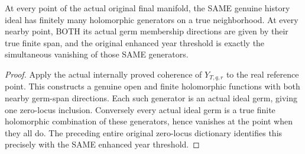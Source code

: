 \begin{theorem}
\label{hir:original-global-companion-history-year-local-generators}
\leanok
{}
At every point of the actual original final manifold, the SAME genuine history
ideal has finitely many holomorphic generators on a true neighborhood. At
every nearby point, BOTH its actual germ membership directions are given by
their true finite span, and the original enhanced year threshold is exactly
the simultaneous vanishing of those SAME generators.
\end{theorem}
\begin{proof}
Apply the actual internally proved coherence of $Y_{T,q,r}$ to the real
reference point. This constructs a genuine open and finite holomorphic functions
with both nearby germ-span directions. Each such generator is an actual ideal
germ, giving one zero-locus inclusion. Conversely every actual ideal germ is
a true finite holomorphic combination of these generators, hence vanishes at
the point when they all do. The preceding entire original zero-locus dictionary
identifies this precisely with the SAME enhanced year threshold.
\end{proof}

